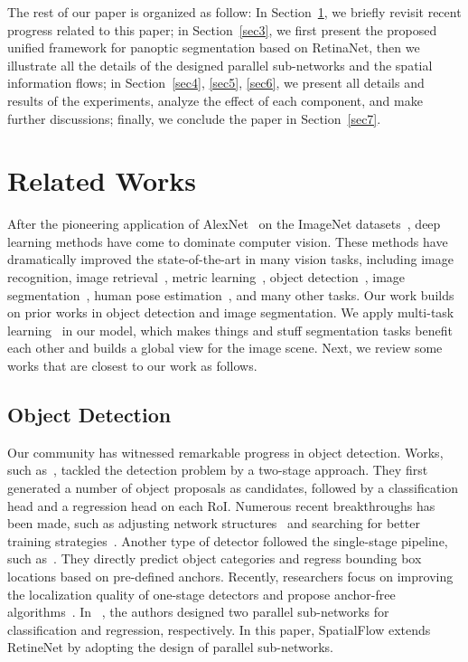 \documentclass[journal,final]{IEEEtran}
\begin{document}
The rest of our paper is organized as follow: In Section~\ref{sec2}, we briefly revisit recent progress related to this paper; in Section~\ref{sec3}, we first present the proposed unified framework for panoptic segmentation based on RetinaNet, then we illustrate all the details of the designed parallel sub-networks and the spatial information flows; in Section~\ref{sec4}, \ref{sec5}, \ref{sec6}, we present all details and results of the experiments, analyze the effect of each component, and make further discussions; finally, we conclude the paper in Section~\ref{sec7}.

\section{Related Works} \label{sec2}
After the pioneering application of AlexNet~\cite{alexnet} on the ImageNet datasets~\cite{imagenet}, deep learning methods have come to dominate computer vision. These methods have dramatically improved the state-of-the-art in many vision tasks, including image recognition\cite{alexnet, yu2014high, vgg, googlenet, resnet, zhou2016fine, yu2019hierarchical}, image retrieval~\cite{yu2014learning, wang2015deep}, metric learning~\cite{hoffer2015deep, yu2016deep, oh2016deep}, object detection~\cite{rcnn, fastrcnn, fasterrcnn}, image segmentation~\cite{dilatedconv, unet, maskrcnn}, human pose estimation~\cite{cao2017realtime, hong2015multimodal}, and many other tasks. Our work builds on prior works in object detection and image segmentation. We apply multi-task learning~\cite{zhangoverview, kendall2018multi} in our model, which makes things and stuff segmentation tasks benefit each other and builds a global view for the image scene. Next, we review some works that are closest to our work as follows.

\subsection{Object Detection} 
Our community has witnessed remarkable progress in object detection. Works, such as~\cite{fastrcnn, fasterrcnn, rfcn}, tackled the detection problem by a two-stage approach. They first generated a number of object proposals as candidates, followed by a classification head and a regression head on each RoI. Numerous recent breakthroughs has been made, such as adjusting network structures~\cite{fpn, cascadercnn} and searching for better training strategies~\cite{snip, sniper, trident}. Another type of detector followed the single-stage pipeline, such as~\cite{yolo, ssd, retinanet}. They directly predict object categories and regress bounding box locations based on pre-defined anchors. Recently, researchers focus on improving the localization quality of one-stage detectors and propose anchor-free algorithms~\cite{garpn, fsaf, fcos, cornernet, centernet}. In ~\cite{retinanet}, the authors designed two parallel sub-networks for classification and regression, respectively. In this paper, SpatialFlow extends RetineNet by adopting the design of parallel sub-networks. 
\end{document}

